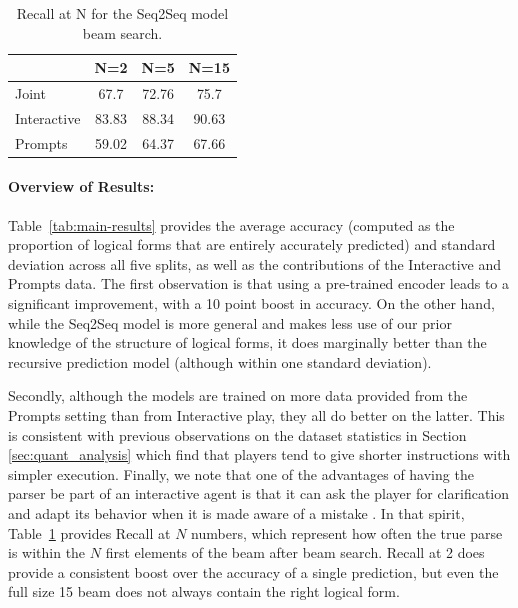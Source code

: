\begin{table}
\small
\center
\begin{tabular}{l|ccc}
            & N=2   & N=5   & N=15 \\
\midrule
Joint       & 67.7  & 72.76 & 75.7 \\
Interactive & 83.83 & 88.34 & 90.63 \\
Prompts   	& 59.02 & 64.37 & 67.66
\end{tabular}
\caption{\label{tab:beam-search} Recall at N for the Seq2Seq model beam search.}
\end{table}

\paragraph{Overview of Results: } Table~\ref{tab:main-results} provides the average accuracy (computed as the proportion of logical forms that are entirely accurately predicted) and standard deviation across all five splits, as well as the contributions of the Interactive and Prompts data. The first observation is that using a pre-trained encoder leads to a significant improvement, with a 10 point boost in accuracy. On the other hand, while the Seq2Seq model is more general and makes less use of our prior knowledge of the structure of logical forms, it does marginally better than the recursive prediction model (although within one standard deviation). 

Secondly, although the models are trained on more data provided from the Prompts setting than from Interactive play, they all do better on the latter. This is consistent with previous observations on the dataset statistics in Section \ref{sec:quant_analysis} which find that players tend to give shorter instructions with simpler execution. Finally, we note that one of the advantages of having the parser be part of an interactive agent is that it can ask the player for clarification and adapt its behavior when it is made aware of a mistake \citep{yao2019interactive}. In that spirit, Table~\ref{tab:beam-search} provides Recall at $N$ numbers, which represent how often the true parse is within the $N$ first elements of the beam after beam search. Recall at 2 does provide a consistent boost over the accuracy of a single prediction, but even the full size 15 beam does not always contain the right logical form.

